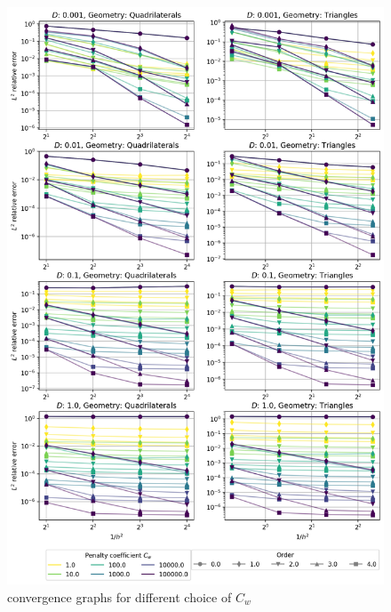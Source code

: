 \begin{figure}[p!]
	\centering
	\includegraphics[height=\textheight]{../figs/parametric/advdiff_2D/quarteroni2.png}
	
	\caption{ convergence graphs for different choice of $C_w$}
	\label{fig:conv_qart2}
\end{figure}
